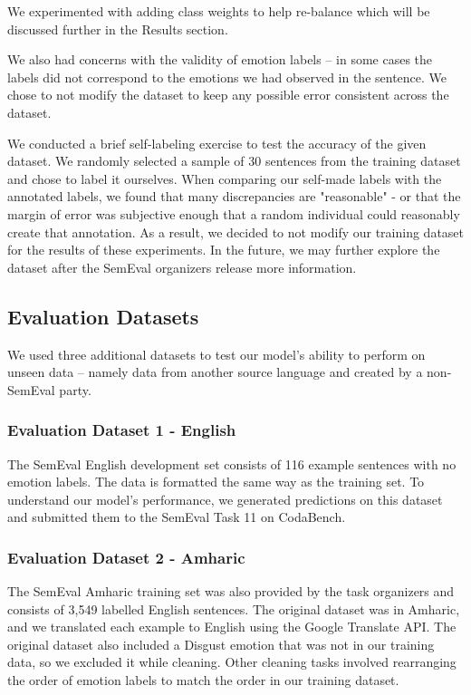 \documentclass[11pt]{article}
\begin{document}
We experimented with adding class weights to help re-balance which will be discussed further in the Results section.

We also had concerns with the validity of emotion labels – in some cases the labels did not correspond to the emotions we had observed in the sentence. We chose to not modify the dataset to keep any possible error consistent across the dataset.\cite{mohammad-2023-best}

We conducted a brief self-labeling exercise to test the accuracy of the given dataset. We randomly selected a sample of 30 sentences from the training dataset and chose to label it ourselves. When comparing our self-made labels with the annotated labels, we found that many discrepancies are "reasonable" - or that the margin of error was subjective enough that a random individual could reasonably create that annotation. As a result, we decided to not modify our training dataset for the results of these experiments. In the future, we may further explore the dataset after the SemEval organizers release more information.

\subsection{Evaluation Datasets}

We used three additional datasets to test our model’s ability to perform on unseen data – namely data from another source language and created by a non-SemEval party.

\subsubsection{Evaluation Dataset 1 - English}

The SemEval English development set consists of 116 example sentences with no emotion labels. The data is formatted the same way as the training set. To understand our model’s performance, we generated predictions on this dataset and submitted them to the SemEval Task 11 on CodaBench.

\subsubsection{Evaluation Dataset 2 - Amharic}

The SemEval Amharic training set was also provided by the task organizers and consists of 3,549 labelled English sentences. The original dataset was in Amharic, and we translated each example to English using the Google Translate API. The original dataset also included a Disgust emotion that was not in our training data, so we excluded it while cleaning. Other cleaning tasks involved rearranging the order of emotion labels to match the order in our training dataset.
\end{document}
